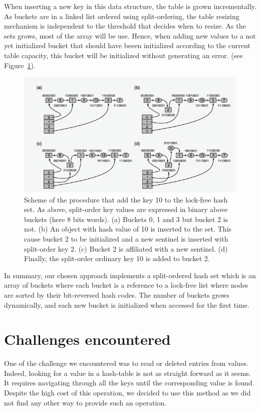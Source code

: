 \documentclass[a4paper,11pt]{report}
\begin{document}
    When inserting a new key in this data structure, the table is grown incrementally.
    As buckets are in a linked list ordered using split-ordering, the table resizing mechanism is independent to
    the threshold that decides when to resize. As the sets grows, most of the array will be use. Hence, when adding
    new values to a not yet initialized bucket that should have beeen initialized according to the current table capacity,
    this bucket will be initialized without generating an error. (see Figure~\ref{fig:Fig2}).


    \begin{figure}[h]
        \centering
            \includegraphics{images/hashsetFig2.png}
        \caption{Scheme of the procedure that add the key 10 to the lock-free hash set.
        As above, split-order key values are expressed in binary above buckets (here 8 bits words).
        (a) Buckets 0, 1 and 3 but bucket 2 is not.
        (b) An object with hash value of 10 is inserted to the set. This cause bucket 2 to be initialized and a new sentinel is inserted with split-order key 2.
        (c) Bucket 2 is affiliated with a new sentinel.
        (d) Finally, the split-order ordinary key 10 is added to bucket 2.}
        \label{fig:Fig2}
    \end{figure}

    In summary, our chosen approach implements a split-ordered hash set which is an array of buckets where each bucket
    is a reference to a lock-free list where nodes are sorted by their bit-reversed hash codes.
    The number of buckets grows dynamically, and each new bucket is initialized when accessed for the first time.

    \section*{Challenges encountered}
    One of the challenge we encountered was to read or deleted entries from values.
    Indeed, looking for a value in a hash-table is not as straight forward as it seems.
    It requires navigating through all the keys until the corresponding value is found.
    Despite the high cost of this operation, we decided to use this method as we did not find any other way to provide
    such an operation.
\end{document}
